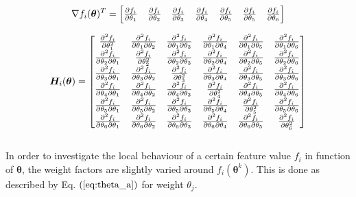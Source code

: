 \begin{equation}\label{eq:Grad}
\centering
\nabla f_i(\bm{\theta})^T = 
\begin{bmatrix}
\pdv{f_i}{\theta_1} & \pdv{f_i}{\theta_2} & \pdv{f_i}{\theta_3} & \pdv{f_i}{\theta_4} &\pdv{f_i}{\theta_5} & \pdv{f_i}{\theta_5} & \pdv{f_i}{\theta_6}
\end{bmatrix}
\end{equation}

\begin{equation}\label{eq:Hess}
\centering
\bm{H}_i(\bm{\theta}) = 
\begin{bmatrix}

 \pdv[2]{f_i}{\theta_1} & \pdv{f_i}{\theta_1}{\theta_2}& \pdv{f_i}{\theta_1}{\theta_3}& \pdv{f_i}{\theta_1}{\theta_4}& \pdv{f_i}{\theta_1}{\theta_5}& \pdv{f_i}{\theta_1}{\theta_6}\\
 
  \pdv{f_i}{\theta_2}{\theta_1}&\pdv[2]{f_i}{\theta_2} & \pdv{f_i}{\theta_2}{\theta_3}& \pdv{f_i}{\theta_2}{\theta_4}&\pdv{f_i}{\theta_2}{\theta_5}&\pdv{f_i}{\theta_2}{\theta_6}\\
  
  \pdv{f_i}{\theta_3}{\theta_1}&\pdv{f_i}{\theta_3}{\theta_2}&\pdv[2]{f_i}{\theta_3} &  \pdv{f_i}{\theta_3}{\theta_4}&\pdv{f_i}{\theta_3}{\theta_5}&\pdv{f_i}{\theta_3}{\theta_6}\\
  
  \pdv{f_i}{\theta_4}{\theta_1}&\pdv{f_i}{\theta_4}{\theta_2} &  \pdv{f_i}{\theta_4}{\theta_3}&\pdv[2]{f_i}{\theta_4}&\pdv{f_i}{\theta_4}{\theta_5}&\pdv{f_i}{\theta_4}{\theta_6}\\
  
  \pdv{f_i}{\theta_5}{\theta_1}&\pdv{f_i}{\theta_5}{\theta_2} &  \pdv{f_i}{\theta_5}{\theta_3}&\pdv{f_i}{\theta_5}{\theta_4}&\pdv[2]{f_i}{\theta_5}&\pdv{f_i}{\theta_5}{\theta_6}\\
  
  \pdv{f_i}{\theta_6}{\theta_1}&\pdv{f_i}{\theta_6}{\theta_2} &  \pdv{f_i}{\theta_6}{\theta_3}&\pdv{f_i}{\theta_6}{\theta_4}&\pdv{f_i}{\theta_6}{\theta_5}&\pdv[2]{f_i}{\theta_6}

\end{bmatrix}
\end{equation}\\

In order to investigate the local behaviour of a certain feature value $f_i$ in function of $\bm{\theta}$, the weight factors are slightly varied around $f_i(\bm{\theta}^k)$. This is done as described by Eq. $(\ref{eq:theta_a})$ for weight $\theta_j$.

